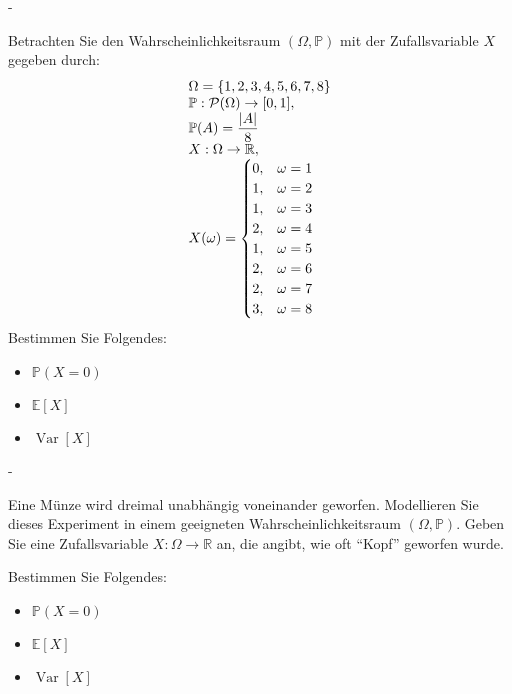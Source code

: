 \documentclass{article}
\begin{document}
\begin{solution}
-
\end{solution}

\newpage

\begin{problem}
Betrachten Sie den Wahrscheinlichkeitsraum $(\Omega, \mathbb{P})$ mit der Zufallsvariable $X$ gegeben durch:
\[
\begin{array}{>{\displaystyle}l}
\Omega = \{1, 2, 3, 4, 5, 6, 7, 8\} \\
\mathbb{P}: \mathcal{P}(\Omega) \to [0, 1], \\
\mathbb{P}(A) = \frac{|A|}{8} \\
X: \Omega \to \mathbb{R}, \\
X(\omega) = \begin{cases}
0, & \omega = 1 \\
1, & \omega = 2 \\
1, & \omega = 3 \\
2, & \omega = 4 \\
1, & \omega = 5 \\
2, & \omega = 6 \\
2, & \omega = 7 \\
3, & \omega = 8 \\
\end{cases}
\end{array}
\]
Bestimmen Sie Folgendes:
\begin{itemize}
\item $\mathbb{P}(X = 0)$
\item $\mathbb{E}[X]$
\item $\operatorname{Var}[X]$
\end{itemize}
\end{problem}

\begin{solution}
-
\end{solution}

\newpage

\begin{problem}
Eine Münze wird dreimal unabhängig voneinander geworfen. Modellieren Sie dieses Experiment in einem geeigneten Wahrscheinlichkeitsraum $(\Omega, \mathbb{P})$. Geben Sie eine Zufallsvariable $X: \Omega \to \mathbb{R}$ an, die angibt, wie oft ``Kopf'' geworfen wurde.
\par
Bestimmen Sie Folgendes:
\begin{itemize}
\item $\mathbb{P}(X = 0)$
\item $\mathbb{E}[X]$
\item $\operatorname{Var}[X]$
\end{itemize}
\end{problem}
\end{document}
